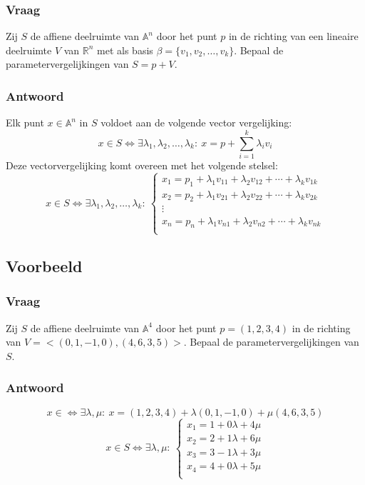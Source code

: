 \documentclass[main.tex]{subfiles}
\begin{document}
\subsubsection*{Vraag}
\begin{center}
  Zij $S$ de affiene deelruimte van $\mathbb{A}^{n}$ door het punt $p$ in de richting van een lineaire deelruimte $V$ van $\mathbb{R}^{n}$ met als basis $\beta=\{v_{1},v_{2},\dotsc,v_{k}\}$.
  Bepaal de parametervergelijkingen van $S=p+V$.
\end{center}
\subsubsection*{Antwoord}
Elk punt $x\in \mathbb{A}^{n}$ in $S$ voldoet aan de volgende vector vergelijking:
\[ x\in S \Leftrightarrow \exists \lambda_{1},\lambda_{2},\dotsc ,\lambda_{k}:\ x =  p  + \sum_{i=1}^{k}\lambda_{i}v_{i} \]
Deze vectorvergelijking komt overeen met het volgende stelsel:
\[
x \in S \Leftrightarrow \exists \lambda_{1},\lambda_{2},\dotsc ,\lambda_{k}:\
\left\{
  \begin{array}{c}
    x_{1} = p_{1} + \lambda_{1}v_{11} + \lambda_{2}v_{12} + \dotsb + \lambda_{k}v_{1k}\\
    x_{2} = p_{2} + \lambda_{1}v_{21} + \lambda_{2}v_{22} + \dotsb + \lambda_{k}v_{2k}\\
    \vdots \\
    x_{n} = p_{n} + \lambda_{1}v_{n1} + \lambda_{2}v_{n2} + \dotsb + \lambda_{k}v_{nk}\\
  \end{array}
\right.
\]

\subsection*{Voorbeeld}
\subsubsection*{Vraag}
\begin{center}
  Zij $S$ de affiene deelruimte van $\mathbb{A}^{4}$ door het punt $p= (1,2,3,4)$ in de richting van $V = <(0,1,-1,0), (4,6,3,5)>$.
  Bepaal de parametervergelijkingen van $S$.
\end{center}
\subsubsection*{Antwoord}
\[
x \in \Leftrightarrow \exists \lambda,\mu:\ x = (1,2,3,4) + \lambda (0,1,-1,0) + \mu (4,6,3,5)
\]
\[
x \in S \Leftrightarrow \exists \lambda, \mu:\
\left\{
  \begin{array}{c}
    x_{1} = 1 + 0\lambda + 4\mu\\
    x_{2} = 2 + 1\lambda + 6\mu\\
    x_{3} = 3 - 1\lambda + 3\mu\\
    x_{4} = 4 + 0\lambda + 5\mu\\
  \end{array}
\right.
\]
\end{document}
